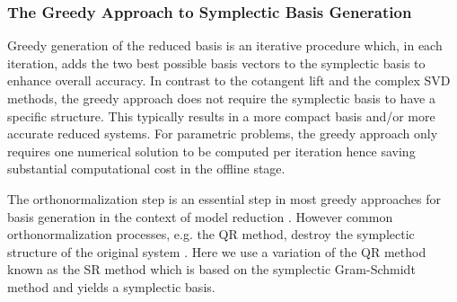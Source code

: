 \documentclass[final]{siamart}
\begin{document}
\subsubsection{The Greedy Approach to Symplectic Basis Generation} \label{Chap:Symo.PrSy:3} Greedy generation of the reduced basis is an iterative procedure which, in each iteration, adds the two best possible basis vectors to the symplectic basis to enhance overall accuracy. In contrast to the cotangent lift and the complex SVD methods, the greedy approach does not require the symplectic basis to have a specific structure. This typically results in a more compact basis and/or more accurate reduced systems. For parametric problems, the greedy approach only requires one numerical solution to be computed per iteration hence saving substantial computational cost in the offline stage. 

{{\color{black}} The orthonormalization step is an essential step in most greedy approaches for basis generation in the context of model reduction \cite{Anonymous:2016wl,Quarteroni:2016wi}. However common orthonormalization processes, e.g. the QR method, destroy the symplectic structure of the original system \cite{BunseGerstner:1986dg}. Here we use a variation of the QR method known as the SR \cite{Salam2014} method which is based on the symplectic Gram-Schmidt method and yields a symplectic basis. 
}
\end{document}
